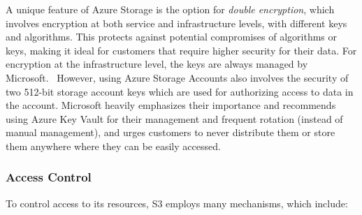 A unique feature of Azure Storage is the option for \textit{double encryption}, which involves encryption at both service and infrastructure levels, with different keys and algorithms. This protects against potential compromises of algorithms or keys, making it ideal for customers that require higher security for their data. For encryption at the infrastructure level, the keys are always managed by Microsoft.~\cite{blob_at_rest} However, using Azure Storage Accounts also involves the security of two 512-bit storage account keys which are used for authorizing access to data in the account. Microsoft heavily emphasizes their importance and recommends using Azure Key Vault for their management and frequent rotation (instead of manual management), and urges customers to never distribute them or store them anywhere where they can be easily accessed.~ \cite {blob_account_keys}

\subsubsection{Access Control}
To control access to its resources, S3 employs many mechanisms, which include: ~\cite{s3faq, s3_access,s3_access_guidelines,s3_scp,s3_vpc,s3vsblobsecurity}

